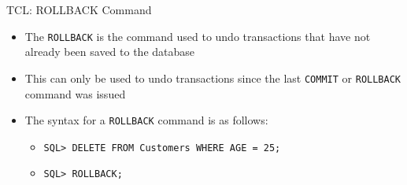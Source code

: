 \documentclass[aspectratio=169, xcolor=dvipsnames]{beamer}
\begin{document}
\begin{frame}[fragile]{TCL: ROLLBACK Command}
    \begin{itemize}[<+->]
        \item The \texttt{ROLLBACK} is the command used to undo transactions that have not already been saved to the database
        \item This can only be used to undo transactions since the last \texttt{COMMIT} or \texttt{ROLLBACK} command was issued
        \item The syntax for a \texttt{ROLLBACK} command is as follows:
        \begin{itemize}
            \item \texttt{SQL> DELETE FROM Customers WHERE AGE = 25;}
            \item \texttt{SQL> ROLLBACK;}
        \end{itemize}
    \end{itemize}
    \vspace{0.5em}
\end{frame}
\end{document}

